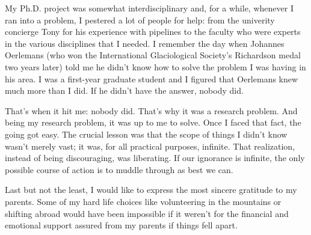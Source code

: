My Ph.D. project was somewhat interdisciplinary and, for a while, whenever I ran into a problem, I pestered a
lot of people for help: from the univerity concierge Tony for his experience with pipelines to the faculty who
were experts in the various disciplines that I needed. I remember the day when Johannes Oerlemans (who won the
International Glaciological Society's Richardson medal two years later) told me he didn't know how to solve the
problem I was having in his area. I was a first-year graduate student and I figured that Oerlemans knew much
more than I did. If he didn't have the answer, nobody did.

That's when it hit me: nobody did. That's why it was a research problem. And being my research problem, it was
up to me to solve. Once I faced that fact, the going got easy. The crucial lesson was that the scope of things I
didn't know wasn't merely vast; it was, for all practical purposes, infinite. That realization, instead of being
discouraging, was liberating. If our ignorance is infinite, the only possible course of action is to muddle
through as best we can.

Last but not the least, I would like to express the most sincere gratitude to my parents. Some of my hard life
choices like volunteering in the mountains or shifting abroad would have been impossible if it weren't for the
financial and emotional support assured from my parents if things fell apart.











